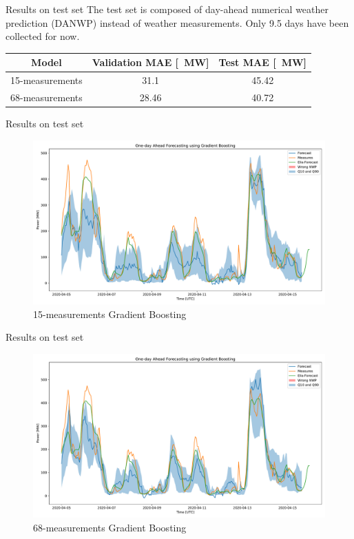 \documentclass[12pt]{beamer}
\begin{document}
\begin{frame}{Results on test set}
    The test set is composed of day-ahead numerical weather prediction (DANWP) instead of weather measurements. Only 9.5 days have been collected for now.
    \begin{center}
    \begin{tabular}{|c|c|c|}
        \hline
        Model & Validation MAE [\SI{}{\mega \watt}] & Test MAE [\SI{}{\mega \watt}] \\ \hline
        15-measurements & 31.1 & 45.42 \\ \hline
        68-measurements & 28.46 & 40.72 \\ \hline
    \end{tabular}
    \end{center}
\end{frame}

\begin{frame}{Results on test set}
    \begin{figure}[H]
        \includegraphics[width=\textwidth]{resources/pdf/odaf15_april.pdf}
        \caption{15-measurements Gradient Boosting}
    \end{figure}
\end{frame}

\begin{frame}{Results on test set}
    \begin{figure}[H]
        \includegraphics[width=\textwidth]{resources/pdf/odaf68_april.pdf}
        \caption{68-measurements Gradient Boosting}
    \end{figure}
\end{frame}
\end{document}
